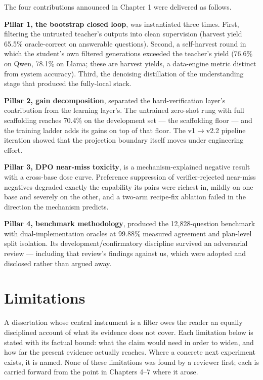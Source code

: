 The four contributions announced in Chapter 1 were delivered as follows.

\textbf{Pillar 1, the bootstrap closed loop}, was instantiated three times. First, filtering the untrusted teacher's outputs into clean supervision (harvest yield 65.5\% oracle-correct on answerable questions). Second, a self-harvest round in which the student's own filtered generations exceeded the teacher's yield (76.6\% on Qwen, 78.1\% on Llama; these are harvest yields, a data-engine metric distinct from system accuracy). Third, the denoising distillation of the understanding stage that produced the fully-local stack.

\textbf{Pillar 2, gain decomposition}, separated the hard-verification layer's contribution from the learning layer's. The untrained zero-shot rung with full scaffolding reaches 70.4\% on the development set --- the scaffolding floor --- and the training ladder adds its gains on top of that floor. The v1$\rightarrow$v2.2 pipeline iteration showed that the projection boundary itself moves under engineering effort.

\textbf{Pillar 3, DPO near-miss toxicity}, is a mechanism-explained negative result with a cross-base dose curve. Preference suppression of verifier-rejected near-miss negatives degraded exactly the capability its pairs were richest in, mildly on one base and severely on the other, and a two-arm recipe-fix ablation failed in the direction the mechanism predicts.

\textbf{Pillar 4, benchmark methodology}, produced the 12,828-question benchmark with dual-implementation oracles at 99.88\% measured agreement and plan-level split isolation. Its development/confirmatory discipline survived an adversarial review --- including that review's findings against us, which were adopted and disclosed rather than argued away.

\section{Limitations}\label{sec:limitations}

A dissertation whose central instrument is a filter owes the reader an equally disciplined account of what its evidence does not cover. Each limitation below is stated with its factual bound: what the claim would need in order to widen, and how far the present evidence actually reaches. Where a concrete next experiment exists, it is named. None of these limitations was found by a reviewer first; each is carried forward from the point in Chapters 4--7 where it arose.

